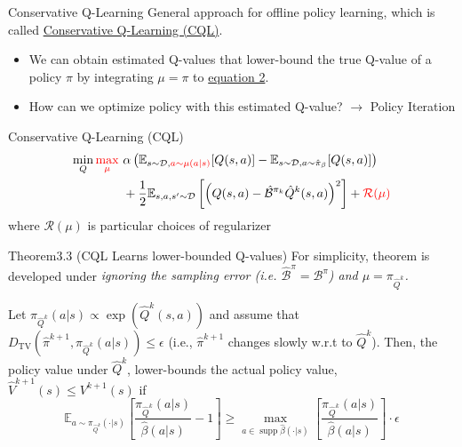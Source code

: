 \documentclass[11pt]{beamer}
\newcommand{\mbb}[1]{\mathbb{#1}}
\newcommand{\mc}[1]{\mathcal{#1}}
\newcommand{\ti}[1]{\textit{#1}}
\newcommand{\supp}{\operatorname{supp}}
\begin{document}
\begin{frame}{Conservative Q-Learning}
  General approach for offline policy learning, which is called \underline{Conservative Q-Learning (CQL)}.
  \begin{itemize}
    \item We can obtain estimated Q-values that lower-bound the true Q-value of a policy $\pi$ by integrating $\mu = \pi$ to \hyperlink{eq:2}{equation 2}.
    \item How can we optimize policy with this estimated Q-value? $\rightarrow$ Policy Iteration
  \end{itemize}
  \begin{block}{Conservative Q-Learning (CQL)}
    \[
    \begin{aligned}
      \min_{Q} \textcolor{red}{\max_{\mu}} \ &\alpha \left( \mbb{E}_{s \sim \mc{D}, \textcolor{red}{a \sim \mu(a|s)}}[Q(s,a)] - \mbb{E}_{s \sim \mc{D}, a \sim \hat{\pi}_\beta} [Q(s,a)] \right) \\
      &+ \frac{1}{2} \mbb{E}_{s,a,s^\prime \sim \mc{D}}\left[\left(Q(s,a) - \hat{\mc{B}}^{\pi_k}\hat{Q}^k (s,a) \right)^2 \right] + \textcolor{red}{\mc{R}(\mu)}
    \end{aligned}
    \]
    where $\mc{R}(\mu)$ is particular choices of regularizer
  \end{block}

    \begin{block}{Theorem3.3 (CQL Learns lower-bounded Q-values)}
    For simplicity, theorem is developed under \hypertarget{thm:3_3_assumption}{\ti{ignoring the sampling error (i.e. $\hat{\mc{B}}^\pi = \mc{B}^\pi$) and $\mu = \pi_{\hat{Q}^k}$.}}

    Let $\pi_{\hat{Q}^k}(a|s) \propto \exp(\hat{Q}^k(s,a))$ and assume that $D_{\text{TV}}(\hat{\pi}^{k+1}, \pi_{\hat{Q}^k}(a|s)) \leq \epsilon$ (i.e., $\hat{\pi}^{k+1}$ changes slowly w.r.t to $\hat{Q}^k$).
    Then, the policy value under $\hat{Q}^k$, lower-bounds the actual policy value, $\hat{V}^{k+  1} (s) \leq V^{k+1}(s)$ if
    \[
      \mbb{E}_{a \sim \pi_{\hat{Q}^k}(\cdot|s)}\left[\frac{\pi_{\hat{Q}^k}(a|s)}{\hat{\beta}(a|s)}-1\right] \geq \max_{a \in \supp \hat{\beta}(\cdot|s)} \left[\frac{\pi_{\hat{Q}^k}(a|s)}{\hat{\beta}(a|s)} \right]\cdot \epsilon
    \]
  \end{block}
\end{frame}
\end{document}
